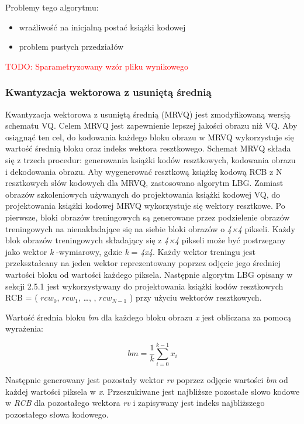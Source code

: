\documentclass{article}
\newcommand{\todo}[1]{\textcolor{red}{TODO: #1}}
\begin{document}
Problemy tego algorytmu:

\begin{itemize}
	\item wrażliwość na inicjalną postać książki kodowej 
	\item problem pustych przedziałów 
\end{itemize}

\todo{Sparametryzowany wzór pliku wynikowego}

\subsubsection{Kwantyzacja wektorowa z usuniętą średnią}

Kwantyzacja wektorowa z usuniętą średnią (MRVQ) jest zmodyfikowaną wersją schematu VQ. Celem MRVQ jest zapewnienie lepszej jakości obrazu niż VQ. Aby osiągnąć ten cel, do kodowania każdego bloku obrazu w MRVQ wykorzystuje się wartość średnią bloku oraz indeks wektora resztkowego. Schemat MRVQ składa się z trzech procedur: generowania książki kodów resztkowych, kodowania obrazu i dekodowania obrazu. Aby wygenerować resztkową książkę kodową RCB z N resztkowych słów kodowych dla MRVQ, zastosowano algorytm LBG. Zamiast obrazów szkoleniowych używanych do projektowania książki kodowej VQ, do projektowania książki kodowej MRVQ wykorzystuje się wektory resztkowe. Po pierwsze, bloki obrazów treningowych są generowane przez podzielenie obrazów treningowych na nienakładające się na siebie bloki obrazów o \textit{4×4} pikseli. Każdy blok obrazów treningowych składający się z \textit{4×4} pikseli może być postrzegany jako wektor \textit{k} -wymiarowy, gdzie \textit{k} = \textit{4x4}. Każdy wektor treningu jest przekształcany na jeden wektor reprezentowany poprzez odjęcie jego średniej wartości bloku od wartości każdego piksela. Następnie algorytm LBG opisany w sekcji 2.5.1 jest wykorzystywany do projektowania książki kodów resztkowych RCB = ( $rcw_{0}$, $rcw_{1}$, \dots , , $rcw_{N-1}$ ) przy użyciu wektorów resztkowych.

Wartość średnia bloku \textit{bm} dla każdego bloku obrazu \textit{x} jest obliczana za pomocą wyrażenia: 

\begin{equation}
bm = \frac{1}{k} \sum_{i=0}^{k-1} x_{i}
\end{equation}

Następnie generowany jest pozostały wektor \textit{rv} poprzez odjęcie wartości \textit{bm} od każdej wartości piksela w \textit{x}. Przeszukiwane jest najbliższe pozostałe słowo kodowe w \textit{RCB} dla pozostałego wektora \textit{rv} i zapisywany jest indeks najbliższego pozostałego słowa kodowego.\cite{meanremovedVQ} 
\end{document}
